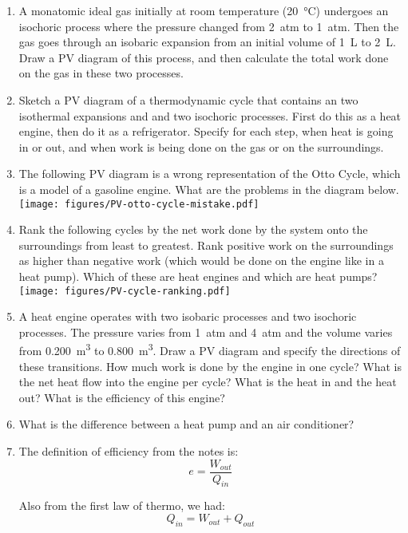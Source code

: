 \begin{enumerate}
\item
A monatomic ideal gas initially at room temperature (\SI{20}{\celsius}) undergoes an isochoric process where the pressure changed from \SI{2}{atm} to \SI{1}{atm}. Then the gas goes through an isobaric expansion from an initial volume of \SI{1}{\liter} to \SI{2}{L}. Draw a PV diagram of this process, and then calculate the total work done on the gas in these two processes. 

\item
Sketch a PV diagram of a thermodynamic cycle that contains an two isothermal expansions and and two isochoric processes. First do this as a heat engine, then do it as a refrigerator. Specify for each step, when heat is going in or out, and when work is being done on the gas or on the surroundings.

\item
The following PV diagram is a wrong representation of the Otto Cycle, which is a model of a gasoline engine. What are the problems in the diagram below.\\
\texttt{[image: figures/PV-otto-cycle-mistake.pdf]}

\item
Rank the following cycles by the net work done by the system onto the surroundings from least to greatest. Rank positive work on the surroundings as higher than negative work (which would be done on the engine like in a heat pump). Which of these are heat engines and which are heat pumps?\\
\texttt{[image: figures/PV-cycle-ranking.pdf]}

\item
A heat engine operates with two isobaric processes and two isochoric processes. The pressure varies from \SI{1}{atm} and \SI{4}{atm} and the volume varies from \SI{0.200}{m^3} to \SI{0.800}{m^3}. Draw a PV diagram and specify the directions of these transitions. How much work is done by the engine in one cycle? What is the net heat flow into the engine per cycle? What is the heat in and the heat out? What is the efficiency of this engine?\giantskip

\item
What is the difference between a heat pump and an air conditioner? 

\item
The definition of efficiency from the notes is: \[e = \frac{W_{out}}{Q_{in}}\]

Also from the first law of thermo, we had: \[Q_{in} = W_{out}+Q_{out}\]


\end{enumerate}
